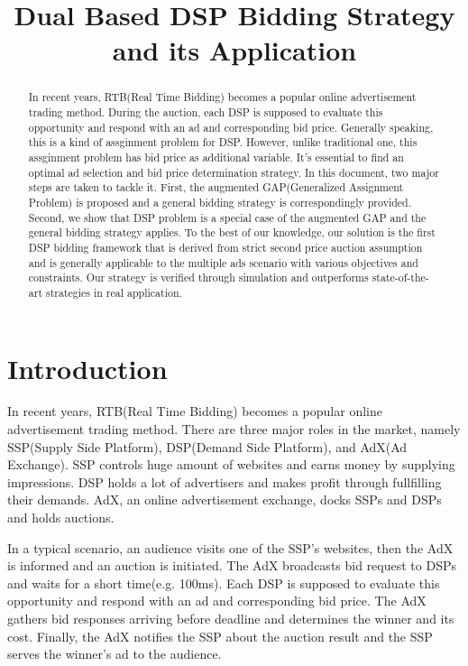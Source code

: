 \documentclass[sigconf]{acmart}
\begin{document}
\title{Dual Based DSP Bidding Strategy and its Application}

\begin{abstract}
In recent years, RTB(Real Time Bidding) becomes a popular online advertisement trading method.
During the auction, each DSP is supposed to evaluate this opportunity and respond with an ad and corresponding bid price.
Generally speaking, this is a kind of assginment problem for DSP.
However, unlike traditional one, this assginment problem has bid price as additional variable.
It's essential to find an optimal ad selection and bid price determination strategy.
In this document, two major steps are taken to tackle it.
First, the augmented GAP(Generalized Assignment Problem) is proposed and a general bidding strategy is correspondingly provided.
Second, we show that DSP problem is a special case of the augmented GAP and the general bidding strategy applies.
To the best of our knowledge, our solution is the first DSP bidding framework
    that is derived from strict second price auction assumption
    and is generally applicable to the multiple ads scenario with various objectives and constraints.
Our strategy is verified through simulation and outperforms state-of-the-art strategies in real application.
\end{abstract}


\maketitle

\section{Introduction}

In recent years, RTB(Real Time Bidding) becomes a popular online advertisement trading method.
There are three major roles in the market, namely SSP(Supply Side Platform), DSP(Demand Side Platform), and AdX(Ad Exchange).
SSP controls huge amount of websites and earns money by supplying impressions.
DSP holds a lot of advertisers and makes profit through fullfilling their demands.
AdX, an online advertisement exchange, docks SSPs and DSPs and holds auctions.

In a typical scenario, an audience visits one of the SSP's websites, then the AdX is informed and an auction is initiated.
The AdX broadcasts bid request to DSPs and waits for a short time(e.g. 100ms).
Each DSP is supposed to evaluate this opportunity and respond with an ad and corresponding bid price.
The AdX gathers bid responses arriving before deadline and determines the winner and its cost.
Finally, the AdX notifies the SSP about the auction result and the SSP serves the winner's ad to the audience.
\end{document}
